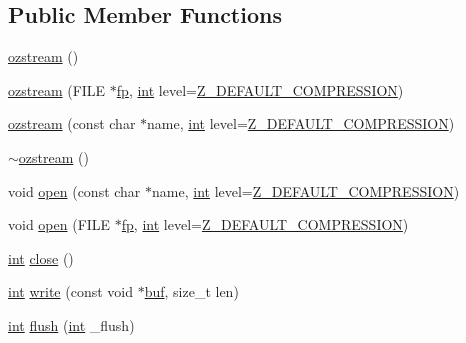 \subsection*{Public Member Functions}
\begin{DoxyCompactItemize}
\item 
\mbox{\hyperlink{classozstream_a5aa4b7d43f5b03e9523cf984560d46b2}{ozstream}} ()
\item 
\mbox{\hyperlink{classozstream_add8c121cdb4538f9f2de2d517c640e61}{ozstream}} (F\+I\+LE $\ast$\mbox{\hyperlink{classozstream_ab1743675ebfa7173c06f803f41844b18}{fp}}, \mbox{\hyperlink{ioapi_8h_a787fa3cf048117ba7123753c1e74fcd6}{int}} level=\mbox{\hyperlink{zlib_8h_af5387baee05124298e431ebe6fe96b17}{Z\+\_\+\+D\+E\+F\+A\+U\+L\+T\+\_\+\+C\+O\+M\+P\+R\+E\+S\+S\+I\+ON}})
\item 
\mbox{\hyperlink{classozstream_af30abfcf07fef0000c7fd3e4ab89eb85}{ozstream}} (const char $\ast$name, \mbox{\hyperlink{ioapi_8h_a787fa3cf048117ba7123753c1e74fcd6}{int}} level=\mbox{\hyperlink{zlib_8h_af5387baee05124298e431ebe6fe96b17}{Z\+\_\+\+D\+E\+F\+A\+U\+L\+T\+\_\+\+C\+O\+M\+P\+R\+E\+S\+S\+I\+ON}})
\item 
\mbox{\hyperlink{classozstream_a56dd28c53840cceea83239d640cae78e}{$\sim$ozstream}} ()
\item 
void \mbox{\hyperlink{classozstream_aea598e6f8f3bb1ffff903546d98b14f0}{open}} (const char $\ast$name, \mbox{\hyperlink{ioapi_8h_a787fa3cf048117ba7123753c1e74fcd6}{int}} level=\mbox{\hyperlink{zlib_8h_af5387baee05124298e431ebe6fe96b17}{Z\+\_\+\+D\+E\+F\+A\+U\+L\+T\+\_\+\+C\+O\+M\+P\+R\+E\+S\+S\+I\+ON}})
\item 
void \mbox{\hyperlink{classozstream_aa5ccfff4546c31dd1f9cd78ad02d446f}{open}} (F\+I\+LE $\ast$\mbox{\hyperlink{classozstream_ab1743675ebfa7173c06f803f41844b18}{fp}}, \mbox{\hyperlink{ioapi_8h_a787fa3cf048117ba7123753c1e74fcd6}{int}} level=\mbox{\hyperlink{zlib_8h_af5387baee05124298e431ebe6fe96b17}{Z\+\_\+\+D\+E\+F\+A\+U\+L\+T\+\_\+\+C\+O\+M\+P\+R\+E\+S\+S\+I\+ON}})
\item 
\mbox{\hyperlink{ioapi_8h_a787fa3cf048117ba7123753c1e74fcd6}{int}} \mbox{\hyperlink{classozstream_a1f5bf09289fa67b17e768435cf4f01f1}{close}} ()
\item 
\mbox{\hyperlink{ioapi_8h_a787fa3cf048117ba7123753c1e74fcd6}{int}} \mbox{\hyperlink{classozstream_a2dbcc101aa6e94eb2ca866e9b8db4c84}{write}} (const void $\ast$\mbox{\hyperlink{ioapi_8h_a8ad8a13c88886b9f623034ff88570adb}{buf}}, size\+\_\+t len)
\item 
\mbox{\hyperlink{ioapi_8h_a787fa3cf048117ba7123753c1e74fcd6}{int}} \mbox{\hyperlink{classozstream_a0fc1b5181044b8d6b6aed0381e8f449c}{flush}} (\mbox{\hyperlink{ioapi_8h_a787fa3cf048117ba7123753c1e74fcd6}{int}} \+\_\+flush)

\end{DoxyCompactItemize}
